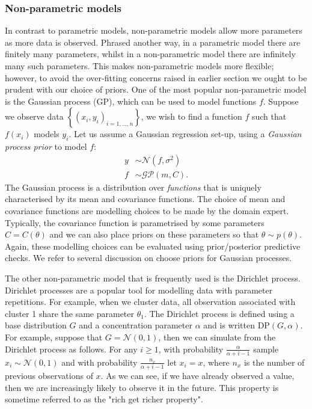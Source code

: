 \documentclass[12pt,english]{article}
\begin{document}
\subsubsection{Non-parametric models}
In contrast to parametric models, non-parametric models allow more parameters as more data is observed. Phrased another way, in a parametric model there are finitely many parameters, whilst in a non-parametric model there are infinitely many such parameters. This makes non-parametric models more flexible; however, to avoid the over-fitting concerns raised in earlier section we ought to be prudent with our choice of priors. One of the most popular non-parametric model is the Gaussian process (GP), which can be used to model functions $f$. Suppose we observe data $\left\{(x_i,y_i)_{i = 1,...,n}\right\}$, we wish to find a function $f$ such that $f(x_i)$ models $y_i$. Let us assume a Gaussian regression set-up, using a \textit{Gaussian process prior} to model $f$:
\begin{equation}
\begin{split}
y &\sim \mathcal{N}(f, \sigma^2)\\
f &\sim \mathcal{GP}(m, C).
\end{split}
\end{equation}
The Gaussian process is a distribution over \textit{functions} that is uniquely characterised by its mean and covariance functions. The choice of mean and covariance functions are modelling choices to be made by the domain expert. Typically, the covariance function is parametrised by some parameters $C = C(\theta)$ and we can also place priors on these parameters so that $\theta \sim p(\theta)$. Again, these modelling choices can be evaluated using prior/posterior predictive checks. We refer to several discussion on choose priors for Gaussian processes.

The other non-parametric model that is frequently used is the Dirichlet process. Dirichlet processes are a popular tool for modelling data with parameter repetitions. For example, when we cluster data, all observation associated with cluster 1 share the same parameter $\theta_1$. The Dirichlet process is defined using a base distribution $G$ and a concentration parameter $\alpha$ and is written $\text{DP}(G, \alpha)$. For example, suppose that $G = \mathcal{N}(0, 1)$, then we can simulate from the Dirichlet process as follows. For any $i \geq 1$, with probability $\frac{\alpha}{\alpha + i - 1}$ sample $x_i \sim \mathcal{N}(0, 1)$ and with probability $\frac{n_x}{\alpha + i - 1}$  let $x_i = x$, where $n_x$ is the number of previous observations of $x$. As we can see, if we have already observed a value, then we are increasingly likely to observe it in the future. This property is sometime referred to as the "rich get richer property".
\end{document}
